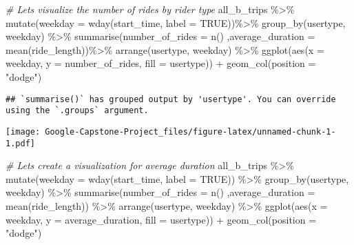 \documentclass[
]{article}
\newenvironment{Shaded}{\begin{snugshade}}{\end{snugshade}}
\newcommand{\AttributeTok}[1]{\textcolor[rgb]{0.77,0.63,0.00}{#1}}
\newcommand{\CommentTok}[1]{\textcolor[rgb]{0.56,0.35,0.01}{\textit{#1}}}
\newcommand{\ConstantTok}[1]{\textcolor[rgb]{0.00,0.00,0.00}{#1}}
\newcommand{\FunctionTok}[1]{\textcolor[rgb]{0.00,0.00,0.00}{#1}}
\newcommand{\NormalTok}[1]{#1}
\newcommand{\SpecialCharTok}[1]{\textcolor[rgb]{0.00,0.00,0.00}{#1}}
\newcommand{\StringTok}[1]{\textcolor[rgb]{0.31,0.60,0.02}{#1}}
\begin{document}
\begin{Shaded}
\begin{Highlighting}[]
\CommentTok{\# Let\textquotesingle{}s visualize the number of rides by rider type}
\NormalTok{all\_b\_trips }\SpecialCharTok{\%\textgreater{}\%} 
  \FunctionTok{mutate}\NormalTok{(}\AttributeTok{weekday =} \FunctionTok{wday}\NormalTok{(start\_time, }\AttributeTok{label =} \ConstantTok{TRUE}\NormalTok{))}\SpecialCharTok{\%\textgreater{}\%}
  \FunctionTok{group\_by}\NormalTok{(usertype, weekday) }\SpecialCharTok{\%\textgreater{}\%} 
  \FunctionTok{summarise}\NormalTok{(}\AttributeTok{number\_of\_rides =} \FunctionTok{n}\NormalTok{()}
\NormalTok{ ,}\AttributeTok{average\_duration =} \FunctionTok{mean}\NormalTok{(ride\_length))}\SpecialCharTok{\%\textgreater{}\%}
  \FunctionTok{arrange}\NormalTok{(usertype, weekday)  }\SpecialCharTok{\%\textgreater{}\%} 
  \FunctionTok{ggplot}\NormalTok{(}\FunctionTok{aes}\NormalTok{(}\AttributeTok{x =}\NormalTok{ weekday, }\AttributeTok{y =}\NormalTok{ number\_of\_rides, }\AttributeTok{fill =}\NormalTok{ usertype)) }\SpecialCharTok{+}
  \FunctionTok{geom\_col}\NormalTok{(}\AttributeTok{position =} \StringTok{"dodge"}\NormalTok{)}
\end{Highlighting}
\end{Shaded}

\begin{verbatim}
## `summarise()` has grouped output by 'usertype'. You can override using the `.groups` argument.
\end{verbatim}

\texttt{[image: Google-Capstone-Project\_files/figure-latex/unnamed-chunk-1-1.pdf]}

\begin{Shaded}
\begin{Highlighting}[]
\CommentTok{\# Let\textquotesingle{}s create a visualization for average duration}
\NormalTok{all\_b\_trips }\SpecialCharTok{\%\textgreater{}\%} 
  \FunctionTok{mutate}\NormalTok{(}\AttributeTok{weekday =} \FunctionTok{wday}\NormalTok{(start\_time, }\AttributeTok{label =} \ConstantTok{TRUE}\NormalTok{)) }\SpecialCharTok{\%\textgreater{}\%} 
  \FunctionTok{group\_by}\NormalTok{(usertype, weekday) }\SpecialCharTok{\%\textgreater{}\%} 
  \FunctionTok{summarise}\NormalTok{(}\AttributeTok{number\_of\_rides =} \FunctionTok{n}\NormalTok{()}
\NormalTok{  ,}\AttributeTok{average\_duration =} \FunctionTok{mean}\NormalTok{(ride\_length)) }\SpecialCharTok{\%\textgreater{}\%} 
  \FunctionTok{arrange}\NormalTok{(usertype, weekday)  }\SpecialCharTok{\%\textgreater{}\%} 
  \FunctionTok{ggplot}\NormalTok{(}\FunctionTok{aes}\NormalTok{(}\AttributeTok{x =}\NormalTok{ weekday, }\AttributeTok{y =}\NormalTok{ average\_duration, }\AttributeTok{fill =}\NormalTok{ usertype)) }\SpecialCharTok{+}
  \FunctionTok{geom\_col}\NormalTok{(}\AttributeTok{position =} \StringTok{"dodge"}\NormalTok{)}
\end{Highlighting}
\end{Shaded}
\end{document}

